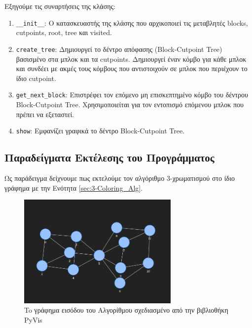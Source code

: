 


Εξηγούμε τις συναρτήσεις της κλάσης:

\begin{enumerate}
	\item \texttt{\_\_init\_\_}: Ο κατασκευαστής της κλάσης που αρχικοποιεί τις μεταβλητές blocks, cutpoints, root, tree και visited.
	
	\item \texttt{create\_tree}: Δημιουργεί το δέντρο απόφασης (Block-Cutpoint Tree) βασισμένο στα μπλοκ και τα cutpoints. Δημιουργεί έναν κόμβο για κάθε μπλοκ και συνδέει με ακμές τους κόμβους που αντιστοιχούν σε μπλοκ που περιέχουν το ίδιο cutpoint.
	
	\item \texttt{get\_next\_block}: Επιστρέφει τον επόμενο μη επισκεπτημένο κόμβο του δέντρου Block-Cutpoint Tree. Χρησιμοποιείται για τον εντοπισμό επόμενου μπλοκ που πρέπει να εξεταστεί.
	
	\item \texttt{show}: Εμφανίζει γραφικά το δέντρο Block-Cutpoint Tree.
\end{enumerate}


\subsection{Παραδείγματα Εκτέλεσης του Προγράμματος}

Ως παράδειγμα δείχνουμε πως εκτελούμε τον αλγόριθμο 3-χρωματισμού στο ίδιο γράφημα με την Ενότητα \ref{sec:3-Coloring_Alg}. 



\begin{figure}[H]
	\centering
	\includegraphics[width=0.7\textwidth]{pictures/coloring-1.png} 
	\caption{To γράφημα εισόδου του Αλγορίθμου σχεδιασμένο από την βιβλιοθήκη PyVis}
	\label{fig:at-free-graph-pyvis-3-colouring}
\end{figure}

